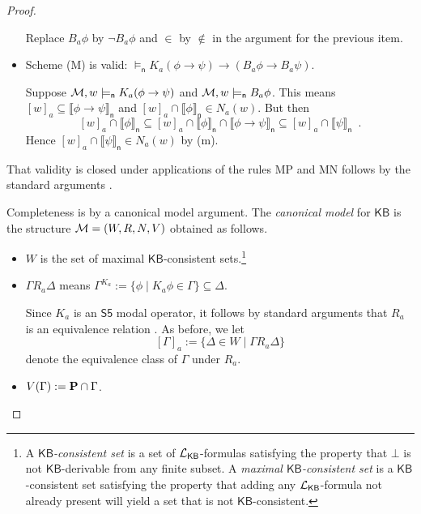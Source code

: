 \documentclass[12pt]{article}
\theoremstyle{definition}
\newcommand{\M}{{\cal M}}      %
\newcommand{\Prop}{{\bf P}}    %
\newcommand{\Lang}{{\cal L}}   %
\newcommand{\KB}{{\mathsf{KB}}}                     %
\newcommand{\modelsn}{\models_{\mathsf{n}}}                  %
\newcommand{\semn}[1]{\llbracket{#1}\rrbracket_{\mathsf{n}}} %
\begin{document}
\begin{proof}
\begin{itemize}
    Replace $B_a\phi$ by $\lnot B_a\phi$ and $\in$ by $\notin$ in the
    argument for the previous item.

  \item Scheme (M) is valid: $\modelsn K_a(\phi\to\psi)\to(B_a\phi\to B_a\psi)$.

    Suppose $\M,w\modelsn K_a(\phi\to\psi)$ and $\M,w\modelsn
    B_a\phi$.  This means $[w]_a\subseteq\semn{\phi\to\psi}$ and
    $[w]_a\cap\semn{\phi}\in N_a(w)$. But then
    \[
    [w]_a\cap\semn{\phi}\subseteq
    [w]_a\cap\semn{\phi}\cap\semn{\phi\to\psi}\subseteq
    [w]_a\cap\semn{\psi}\enspace.
    \]
    Hence $[w]_a\cap\semn{\psi}\in N_a(w)$ by (m).
  \end{itemize}
  That validity is closed under applications of the rules MP and MN
  follows by the standard arguments \cite{BlaRijVen:ml}.

  Completeness is by a canonical model argument. The \emph{canonical
    model} for $\KB$ is the structure $\M=(W,R,N,V)$ obtained as
  follows.
  \begin{itemize}
  \item $W$ is the set of maximal $\KB$-consistent sets.\footnote{A
      \emph{$\KB$-consistent set} is a set of $\Lang_\KB$-formulas
      satisfying the property that $\bot$ is not $\KB$-derivable from
      any finite subset.  A \emph{maximal $\KB$-consistent set} is a
      $\KB$-consistent set satisfying the property that adding any
      $\Lang_\KB$-formula not already present will yield a set that is
      not $\KB$-consistent.}

  \item $\Gamma R_a\Delta$ means $\Gamma^{K_a}:=\{\phi\mid
    K_a\phi\in\Gamma\}\subseteq\Delta$.

    Since $K_a$ is an $\mathsf{S5}$ modal operator, it follows by
    standard arguments that $R_a$ is an equivalence relation
    \cite{BlaRijVen:ml}.  As before, we let
    \[
    [\Gamma]_a:=\{\Delta\in W\mid \Gamma R_a\Delta\}
    \]
    denote the equivalence class of $\Gamma$ under $R_a$.

  \item $V(\Gamma):=\Prop\cap\Gamma$.


\end{itemize}
\end{proof}
\end{document}
